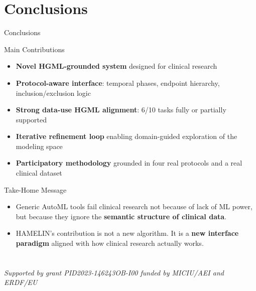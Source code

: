 \documentclass[aspectratio=169,10pt,english,dvipsnames]{beamer}
\begin{document}
\section{Conclusions}

\begin{frame}{Conclusions} \scriptsize
  \begin{block}{Main Contributions}
    \begin{itemize}
      \item \textbf{Novel HGML-grounded system} designed for clinical research
      \item \textbf{Protocol-aware interface}: temporal phases, endpoint hierarchy, inclusion/exclusion logic
      \item \textbf{Strong data-use HGML alignment}: 6/10 tasks fully or partially supported
      \item \textbf{Iterative refinement loop} enabling domain-guided exploration of the modeling space
      \item \textbf{Participatory methodology} grounded in four real protocols and a real clinical dataset
    \end{itemize}
  \end{block}
    \vspace{3mm}
  \begin{block}{Take-Home Message}
  \begin{itemize}
      \item Generic AutoML tools fail clinical research not because of lack of ML power, but because they ignore the \textbf{semantic structure of clinical data}.
      \item HAMELIN's contribution is not a new algorithm. It is a \textbf{new interface paradigm} aligned with how clinical research actually works.
  \end{itemize}
  \end{block}
\end{frame}

\section{}

\begin{frame}
  \titlepage
  \vspace{-4mm}
  \begin{center}
    \scriptsize
    \textit{Supported by grant PID2023-146243OB-I00 funded by MICIU/AEI and ERDF/EU}
  \end{center}
\end{frame}
\end{document}
